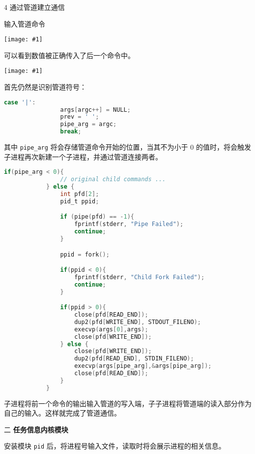 \documentclass[12pt,a4paper]{article}
\newenvironment{problems}{\begin{list}{}{\renewcommand{\makelabel}[1]{\textbf{##1}\hfil}}}{\end{list}}
\newenvironment{steps}{\begin{list}{}{\renewcommand{\makelabel}[1]{##1.\hfil}}}{\end{list}}
\providecommand{\img}[1]{\texttt{[image: \#1]}}
\begin{document}
\begin{problems}
\begin{steps}
        \item[4] 通过管道建立通信
        
        输入管道命令

        \img{less.png}

        可以看到数值被正确传入了后一个命令中。
        
        \img{pipe.png}

        首先仍然是识别管道符号：
        \begin{lstlisting}[language=c]
            case '|':
                args[argc++] = NULL;
                prev = ' ';
                pipe_arg = argc;
                break;
        \end{lstlisting}
        其中 \verb"pipe_arg" 将会存储管道命令开始的位置，当其不为小于 0 的值时，将会触发子进程再次新建一个子进程，并通过管道连接两者。
        \begin{lstlisting}[language=c]
            if(pipe_arg < 0){
                // original child commands ...
            } else {
                int pfd[2];
                pid_t ppid;

                if (pipe(pfd) == -1){
                    fprintf(stderr, "Pipe Failed");
                    continue;
                }

                ppid = fork();

                if(ppid < 0){
                    fprintf(stderr, "Child Fork Failed");
                    continue;
                }

                if(ppid > 0){
                    close(pfd[READ_END]);
                    dup2(pfd[WRITE_END], STDOUT_FILENO);
                    execvp(args[0],args);
                    close(pfd[WRITE_END]);
                } else {
                    close(pfd[WRITE_END]);
                    dup2(pfd[READ_END], STDIN_FILENO);
                    execvp(args[pipe_arg],&args[pipe_arg]);
                    close(pfd[READ_END]);
                }
            }
        \end{lstlisting}
        子进程将前一个命令的输出输入管道的写入端，子子进程将管道端的读入部分作为自己的输入。这样就完成了管道通信。

        
        
    \end{steps} 
    
    \item[二] \textbf{任务信息内核模块}
    
    安装模块 \verb"pid" 后，将进程号输入文件，读取时将会展示进程的相关信息。


\end{problems}
\end{document}
